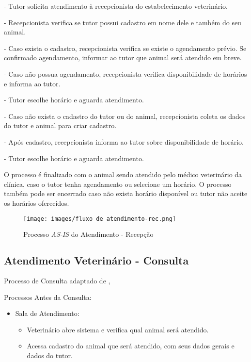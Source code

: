 \documentclass[
    12pt,               %
    openright,          %
    oneside,
    a4paper,            %
    BIBLATEX,           %
    TODO,               %
    english,            %
    brazil              %
    ]{ifsp-spo-inf-ctds}
\begin{document}
      - Tutor solicita atendimento à recepcionista do estabelecimento veterinário.
      
      - Recepcionista verifica se tutor possui cadastro em nome dele e também do seu animal.
      
      - Caso exista o cadastro, recepcionista verifica se existe o agendamento prévio. Se confirmado agendamento, informar ao tutor que animal será atendido em breve.
      
      - Caso não possua agendamento, recepcionista verifica disponibilidade de horários e informa ao tutor.
      
      - Tutor escolhe horário e aguarda atendimento.
      
      - Caso não exista o cadastro do tutor ou do animal, recepcionista coleta os dados do tutor e animal para criar cadastro.
      
      - Após cadastro, recepcionista informa ao tutor sobre disponibilidade de horário.
      
      - Tutor escolhe horário e aguarda atendimento.

    O processo é finalizado com o animal sendo atendido pelo médico veterinário da clínica, caso o tutor tenha agendamento ou selecione um horário. O processo também pode ser encerrado caso não exista horário disponível ou tutor não aceite os horários oferecidos.



    \begin{sidewaysfigure}[H]
        \centering
         \caption{Processo \emph{AS-IS} do Atendimento - Recepção}
        \texttt{[image: images/fluxo de atendimento-rec.png]}
        \label{fluxo-rec}
    \end{sidewaysfigure}  

    \subsection{ Atendimento Veterinário - Consulta}
    Processo de Consulta adaptado de ,     

    
    Processos Antes da Consulta:
	
	\begin{itemize}
	    \item Sala de Atendimento:
            \begin{itemize}
                \item Veterinário abre sistema e verifica qual animal será atendido.
                \item Acessa cadastro do animal que será atendido, com seus dados gerais e dados do tutor.
            \end{itemize}
	\end{itemize}
		
\end{document}
